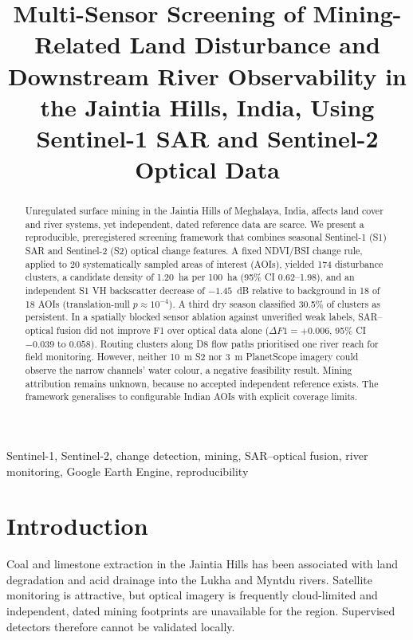 \documentclass[conference]{IEEEtran}
\begin{document}
\title{Multi-Sensor Screening of Mining-Related Land Disturbance and Downstream River Observability in the Jaintia Hills, India, Using Sentinel-1 SAR and Sentinel-2 Optical Data}

\author{
}

\maketitle

\begin{abstract}
Unregulated surface mining in the Jaintia Hills of Meghalaya, India, affects land cover and river systems, yet independent, dated reference data are scarce. We present a reproducible, preregistered screening framework that combines seasonal Sentinel-1 (S1) SAR and Sentinel-2 (S2) optical change features. A fixed NDVI/BSI change rule, applied to 20 systematically sampled areas of interest (AOIs), yielded 174 disturbance clusters, a candidate density of 1.20~ha per 100~ha (95\% CI 0.62--1.98), and an independent S1 VH backscatter decrease of $-1.45$~dB relative to background in 18 of 18 AOIs (translation-null $p\approx10^{-4}$). A third dry season classified 30.5\% of clusters as persistent. In a spatially blocked sensor ablation against unverified weak labels, SAR--optical fusion did not improve F1 over optical data alone ($\Delta F1=+0.006$, 95\% CI $-0.039$ to $0.058$). Routing clusters along D8 flow paths prioritised one river reach for field monitoring. However, neither 10~m S2 nor 3~m PlanetScope imagery could observe the narrow channels' water colour, a negative feasibility result. Mining attribution remains unknown, because no accepted independent reference exists. The framework generalises to configurable Indian AOIs with explicit coverage limits.
\end{abstract}

\begin{IEEEkeywords}
Sentinel-1, Sentinel-2, change detection, mining, SAR--optical fusion, river monitoring, Google Earth Engine, reproducibility
\end{IEEEkeywords}

\section{Introduction}
Coal and limestone extraction in the Jaintia Hills has been associated with land degradation and acid drainage into the Lukha and Myntdu rivers. Satellite monitoring is attractive, but optical imagery is frequently cloud-limited and independent, dated mining footprints are unavailable for the region. Supervised detectors therefore cannot be validated locally.
\end{document}
